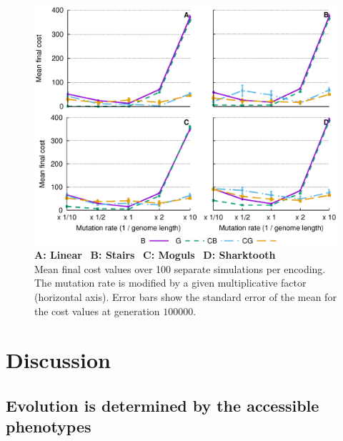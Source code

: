 \documentclass[a4paper,12pt]{article}
\theoremstyle{plain}
\theoremstyle{definition}
\begin{document}
   \begin{figure}[p]
      \hspace{-.5cm}
      \includegraphics[trim=0 5.4cm 4cm 0,width=.9\textwidth]{multimutrates} %
      \caption{
         \textbf{A: Linear} \ \textbf{B: Stairs} \ \textbf{C:
         Moguls} \ \textbf{D: Sharktooth}\\
         Mean final cost values over 100 separate simulations per encoding. The mutation
         rate is modified by a given multiplicative factor (horizontal axis). Error
         bars show the standard error of the mean for the cost values at generation
         $100000$.
      }
      \label{fig:multirobustness}
   \end{figure}

\newpage
\section{Discussion}
   \subsection{Evolution is determined by the accessible phenotypes}
\end{document}
